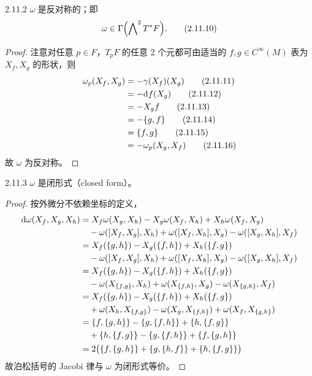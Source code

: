 \begin{proposition*}{2.11.2}
$\omega$ 是反对称的；即
\begin{equation}
  \omega\in\Gamma\Bigl(\bigwedge\nolimits^{2}T^*F\Bigr).
  \tag{2.11.10}
\end{equation}
\end{proposition*}

\begin{proof}
注意对任意 $p\in F$，$T_pF$ 的任意 2 个元都可由适当的 $f,g\in C^\infty(M)$ 表为 $X_f,X_g$ 的形状，则
\begin{align}
  \omega_p(X_f,X_g) &= -\gamma(X_f)(X_g)
  \tag{2.11.11}\\
  &= -\mathrm{d} f(X_g)
  \tag{2.11.12}\\
  &= -X_gf
  \tag{2.11.13}\\
  &= -\{g,f\}
  \tag{2.11.14}\\
  &= \{f,g\}
  \tag{2.11.15}\\
  &= -\omega_p(X_g,X_f)
  \tag{2.11.16}
\end{align}
故 $\omega$ 为反对称。
\end{proof}

\begin{proposition*}{2.11.3}
$\omega$ 是闭形式（closed form）。
\end{proposition*}

\begin{proof}
按外微分不依赖坐标的定义，
\begin{align*}
  \mathrm{d}\omega(X_f,X_g,X_h)
  &= X_f\omega(X_g,X_h)-X_g\omega(X_f,X_h)+X_h\omega(X_f,X_g)\\
  &\quad -\omega([X_f,X_g],X_h)+\omega([X_f,X_h],X_g)-\omega([X_g,X_h],X_f)\\
  &= X_f(\{g,h\})-X_g(\{f,h\})+X_h(\{f,g\})\\
  &\quad -\omega([X_f,X_g],X_h)+\omega([X_f,X_h],X_g)-\omega([X_g,X_h],X_f)\\
  &= X_f(\{g,h\})-X_g(\{f,h\})+X_h(\{f,g\})\\
  &\quad -\omega(X_{\{f,g\}},X_h)+\omega(X_{\{f,h\}},X_g)-\omega(X_{\{g,h\}},X_f)\\
  &= X_f(\{g,h\})-X_g(\{f,h\})+X_h(\{f,g\})\\
  &\quad +\omega(X_h,X_{\{f,g\}})-\omega(X_g,X_{\{f,h\}})+\omega(X_f,X_{\{g,h\}})\\
  &= \{f,\{g,h\}\}-\{g,\{f,h\}\}+\{h,\{f,g\}\}\\
  &\quad +\{h,\{f,g\}\}-\{g,\{f,h\}\}+\{f,\{g,h\}\}\\
  &= 2\bigl(\{f,\{g,h\}\}+\{g,\{h,f\}\}+\{h,\{f,g\}\}\bigr)
\end{align*}
故泊松括号的 Jacobi 律与 $\omega$ 为闭形式等价。
\end{proof}

